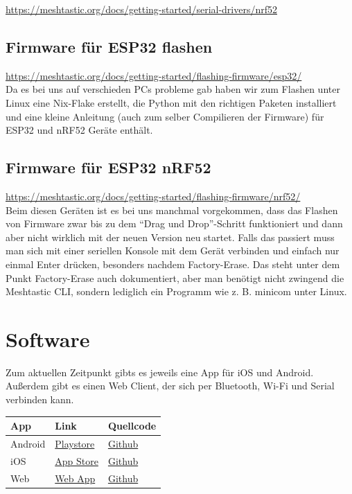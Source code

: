 \documentclass[12pt,a4paper]{article}
\begin{document}
\url{https://meshtastic.org/docs/getting-started/serial-drivers/nrf52}

\subsection{Firmware für ESP32 flashen}
\url{https://meshtastic.org/docs/getting-started/flashing-firmware/esp32/}
\\
Da es bei uns auf verschieden PCs probleme gab haben wir zum Flashen unter Linux eine Nix-Flake erstellt,
die Python mit den richtigen Paketen installiert und eine kleine Anleitung (auch zum selber Compilieren der Firmware)
für ESP32 und nRF52 Geräte enthält.\\

\subsection{Firmware für ESP32 nRF52}
\url{https://meshtastic.org/docs/getting-started/flashing-firmware/nrf52/}
\\
Beim diesen Geräten ist es bei uns manchmal vorgekommen, dass das Flashen von Firmware zwar bis zu dem “Drag und Drop”-Schritt funktioniert und dann aber nicht wirklich mit der neuen Version neu startet. Falls das passiert muss man sich mit einer seriellen Konsole mit dem Gerät verbinden und einfach nur einmal Enter drücken, besonders nachdem Factory-Erase. Das steht unter dem Punkt Factory-Erase auch dokumentiert, aber man benötigt nicht zwingend die Meshtastic CLI, sondern lediglich ein Programm wie z. B. minicom unter Linux.

\section{Software}

Zum aktuellen Zeitpunkt gibts es jeweils eine App für iOS und Android. Außerdem gibt es einen Web Client,
der sich per Bluetooth, Wi-Fi und Serial verbinden kann.\\

\begin{tabular}[h]{l | l | l}
App & Link & Quellcode \\

\hline
Android  & \href{https://play.google.com/store/apps/details?id=com.geeksville.mesh}{Playstore} & \href{https://github.com/meshtastic/Meshtastic-Android}{Github} \\
\hline
iOS & \href{https://apps.apple.com/us/app/meshtastic/id1586432531}{App Store} & \href{https://github.com/meshtastic/Meshtastic-Apple}{Github}  \\
\hline
Web & \href{https://client.meshtastic.org/}{Web App} & \href{https://github.com/meshtastic/web}{Github} \\
\end{tabular}\\
\\
\end{document}
